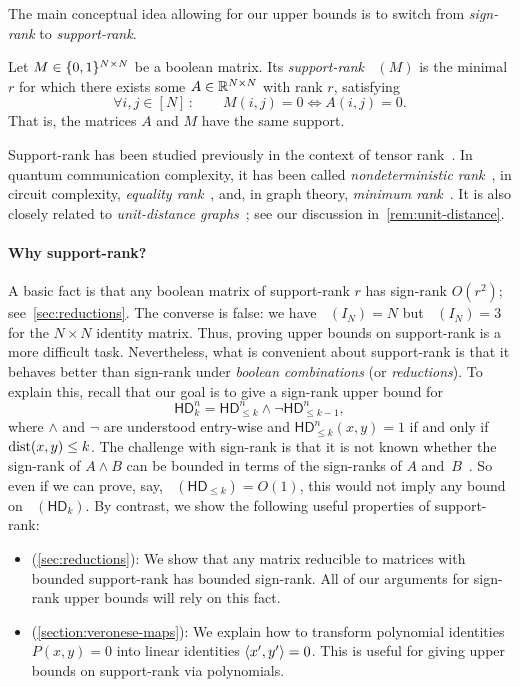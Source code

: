 \documentclass{article}
\DeclareMathOperator{\signrank}{rank_\pm}
\DeclareMathOperator{\suprank}{rank_0}
\newcommand{\HD}[1]{\mathsf{HD}_{#1}}
\begin{document}
The main conceptual idea allowing for our upper bounds is to switch from \emph{sign-rank} to \emph{support-rank}.

\begin{boxdefinition}
Let $M \in \{0,1\}^{N \times N}$ be a boolean matrix. Its \emph{support-rank} $\suprank(M)$ is the minimal $r$ for which there exists some $A \in \mathbb{R}^{N \times N}$ with rank $r$, satisfying
\[
    \forall i,j \in [N]\,\colon\qquad M(i,j) = 0 \iff A(i,j) = 0 .
\]
That is, the matrices $A$ and $M$ have the same support.
\end{boxdefinition}
Support-rank has been studied previously in the context of tensor rank~\cite{CU13,BCZ17,BCZ18}. In quantum communication complexity, it has been called \emph{nondeterministic rank}~\cite{dWol03}, in circuit complexity, \emph{equality rank}~\cite{HP2010}, and, in graph theory, \emph{minimum rank}~\cite{FH07}. It is also closely related to \emph{unit-distance graphs}~\cite{EHT65,AK14}; see our discussion in~\cref{rem:unit-distance}.

\paragraph{Why support-rank?}
A basic fact is that any boolean matrix of support-rank $r$ has sign-rank $O(r^2)$; see~\cref{sec:reductions}. The converse is false: we have $\suprank(I_N)=N$ but $\signrank(I_N)=3$ for the $N\times N$ identity matrix. Thus, proving upper bounds on support-rank is a more difficult task. Nevertheless, what is convenient about support-rank is that it behaves better than sign-rank under \emph{boolean combinations} (or \emph{reductions}). To explain this, recall that our goal is to give a sign-rank upper bound for
\[
    \HD{k}^n = \HD{\leq k}^n \wedge \neg \HD{\leq k-1}^n,
\]
where $\land$ and $\neg$ are understood entry-wise and $\HD{\leq k}^n(x,y) = 1$ if and only if $\operatorname{dist}(x,y) \leq k$. The challenge with sign-rank is that it is
not known whether the sign-rank of $A \wedge B$ can be bounded in terms of the sign-ranks of $A$ and~$B$~\cite{BMT21,HHPTZ22}.  So even if we can prove, say, $\signrank(\HD{\leq k}) =
O(1)$, this would not imply any bound on $\signrank(\HD{k})$. By contrast, we show the following useful properties of support-rank:
\begin{itemize}[itemsep=0pt]
	\item (\cref{sec:reductions}): We show that any matrix reducible to matrices with bounded support-rank has bounded sign-rank. All of our arguments for sign-rank upper bounds will rely on this fact.
	\item (\cref{section:veronese-maps}): We explain how to  transform polynomial identities $P(x,y) = 0$ into linear identities $\langle x',y' \rangle = 0$. This is useful for giving upper bounds on support-rank via polynomials.
\end{itemize}
\end{document}
